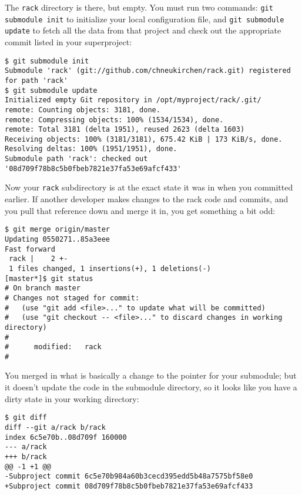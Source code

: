 \documentclass[a4paper]{book}
\begin{document}
The \texttt{rack} directory is there, but empty. You must run two commands: \texttt{git submodule init} to initialize your local configuration file, and \texttt{git submodule update} to fetch all the data from that project and check out the appropriate commit listed in your superproject:

\begin{shaded}\begin{verbatim}
$ git submodule init
Submodule 'rack' (git://github.com/chneukirchen/rack.git) registered for path 'rack'
$ git submodule update
Initialized empty Git repository in /opt/myproject/rack/.git/
remote: Counting objects: 3181, done.
remote: Compressing objects: 100% (1534/1534), done.
remote: Total 3181 (delta 1951), reused 2623 (delta 1603)
Receiving objects: 100% (3181/3181), 675.42 KiB | 173 KiB/s, done.
Resolving deltas: 100% (1951/1951), done.
Submodule path 'rack': checked out '08d709f78b8c5b0fbeb7821e37fa53e69afcf433'
\end{verbatim}\end{shaded}

Now your \texttt{rack} subdirectory is at the exact state it was in when you committed earlier. If another developer makes changes to the rack code and commits, and you pull that reference down and merge it in, you get something a bit odd:

\begin{shaded}\begin{verbatim}
$ git merge origin/master
Updating 0550271..85a3eee
Fast forward
 rack |    2 +-
 1 files changed, 1 insertions(+), 1 deletions(-)
[master*]$ git status
# On branch master
# Changes not staged for commit:
#   (use "git add <file>..." to update what will be committed)
#   (use "git checkout -- <file>..." to discard changes in working directory)
#
#      modified:   rack
#
\end{verbatim}\end{shaded}

You merged in what is basically a change to the pointer for your submodule; but it doesn't update the code in the submodule directory, so it looks like you have a dirty state in your working directory:

\begin{shaded}\begin{verbatim}
$ git diff
diff --git a/rack b/rack
index 6c5e70b..08d709f 160000
--- a/rack
+++ b/rack
@@ -1 +1 @@
-Subproject commit 6c5e70b984a60b3cecd395edd5b48a7575bf58e0
+Subproject commit 08d709f78b8c5b0fbeb7821e37fa53e69afcf433
\end{verbatim}\end{shaded}
\end{document}
